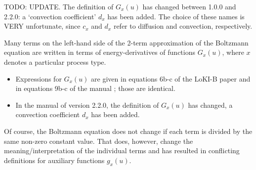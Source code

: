 \documentclass{book}
\begin{document}
TODO: UPDATE. The definition of $G_x(u)$ has changed between 1.0.0 and
2.2.0: a `convection coefficient' $d_x$ has been added. The choice of these
names is VERY unfortunate, since $c_x$ and $d_x$ refer to diffusion and
convection, respectively.

Many terms on the left-hand side of the 2-term approximation of the Boltzmann
equation are written in terms of energy-derivatives of functions $G_x(u)$, where
$x$ denotes a particular process type.
\begin{itemize}
  \item Expressions for $G_x(u)$ are given in equations 6b-c of the LoKI-B paper
        \cite{Tejero2019} and in equations 9b-c of the manual \cite{Manual_1_0_0};
        those are identical.
  \item In the manual of version 2.2.0, the definition of $G_x(u)$ has changed,
	a convection coefficient $d_x$ has been added.
\end{itemize}
Of course, the Boltzmann equation does not change if each term is divided by the
same non-zero constant value. That does, however, change the meaning/interpretation
of the individual terms and has resulted in conflicting definitions for
auxiliary functions $g_x(u)$.
\end{document}
